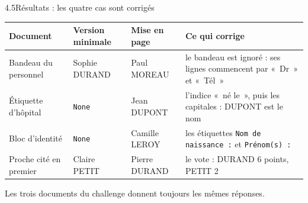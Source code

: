 \documentclass[11pt,aspectratio=169]{beamer}
\newcommand{\tok}[1]{\foreignlanguage{english}{\texttt{#1}}}
\begin{document}
\begin{frame}{4.5\quad Résultats : les quatre cas sont corrigés}
  \begin{center}
    \small
    \renewcommand{\arraystretch}{1.25}
    \begin{tabular}{@{}L{2.8cm}L{2.4cm}L{2.4cm}L{4.7cm}@{}}
      \toprule
      \textbf{Document} & \textbf{Version minimale} & \textbf{Mise en page} & \textbf{Ce qui corrige} \\
      \midrule
      Bandeau du personnel & \textcolor{tred}{Sophie DURAND} & \textcolor{tgreen}{Paul MOREAU}
        & le bandeau est ignoré : ses lignes commencent par «~Dr~» et «~Tél~» \\
      Étiquette d'hôpital & \tok{None} & \textcolor{tgreen}{Jean DUPONT}
        & l'indice «~né le~», puis les capitales : DUPONT est le nom \\
      Bloc d'identité & \tok{None} & \textcolor{tgreen}{Camille LEROY}
        & les étiquettes \tok{Nom de naissance :} et \tok{Prénom(s) :} \\
      Proche cité en premier & \textcolor{tred}{Claire PETIT} & \textcolor{tgreen}{Pierre DURAND}
        & le vote : DURAND 6 points, PETIT 2 \\
      \bottomrule
    \end{tabular}
  \end{center}

  \vspace{0.6em}
  \small Les trois documents du challenge donnent toujours les mêmes réponses.
\end{frame}
\end{document}
